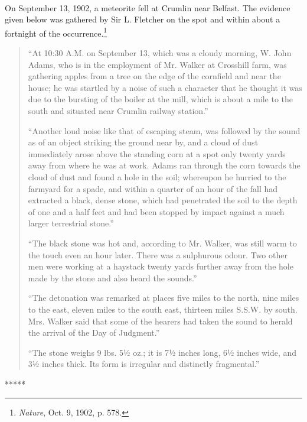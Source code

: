 \documentclass[a4paper, 12pt, oneside, landscape]{article}
\begin{document}
\paragraph{}
On September 13, 1902, a meteorite fell at Crumlin near Belfast. The evidence given below was gathered by Sir L. Fletcher on the spot and within about a fortnight of the occurrence.\footnote{\emph{Nature}, Oct. 9, 1902, p. 578.}
\begin{quotation}
``At 10:30 A.M. on September 13, which was a cloudy morning, W. John Adams, who is in the employment of Mr. Walker at Crosshill farm, was gathering apples from a tree on the edge of the cornfield and near the house; he was startled by a noise of such a character that he thought it was due to the bursting of the boiler at the mill, which is about a mile to the south and situated near Crumlin railway station.''

``Another loud noise like that of escaping steam, was followed by the sound as of an object striking the ground near by, and a cloud of dust immediately arose above the standing corn at a spot only twenty yards away from where he was at work. Adams ran through the corn towards the cloud of dust and found a hole in the soil; whereupon he hurried to the farmyard for a spade, and within a quarter of an hour of the fall had extracted a black, dense stone, which had penetrated the soil to the depth of one and a half feet and had been stopped by impact against a much larger terrestrial stone.''

``The black stone was hot and, according to Mr. Walker, was still warm to the touch even an hour later. There was a sulphurous odour. Two other men were working at a haystack twenty yards further away from the hole made by the stone and also heard the sounds.''

``The detonation was remarked at places five miles to the north, nine miles to the east, eleven miles to the south east, thirteen miles S.S.W. by south. Mrs. Walker said that some of the hearers had taken the sound to herald the arrival of the Day of Judgment.''

``The stone weighs 9 lbs. 5½ oz.; it is 7½ inches long, 6½ inches wide, and 3½ inches thick. Its form is irregular and distinctly fragmental.''
\end{quotation}
\centerline{*\hspace{15mm}*\hspace{15mm}*\hspace{15mm}*\hspace{15mm}*}
\bigskip
\end{document}
